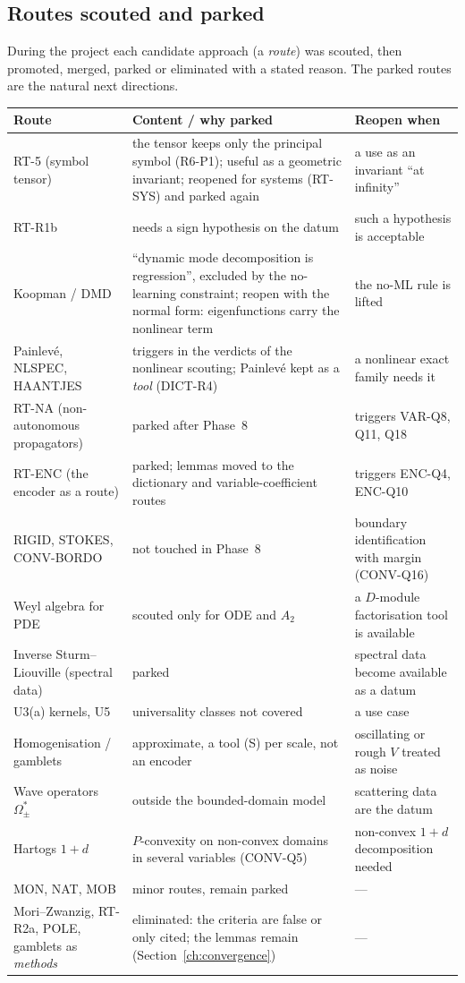 \subsection{Routes scouted and parked}

During the project each candidate approach (a \emph{route}) was scouted, then promoted, merged, parked or eliminated with a stated reason. The parked routes are the natural next directions.

\begin{center}\small
\begin{longtable}{@{}L{3.3cm}L{7.0cm}L{4.3cm}@{}}
\toprule
Route & Content / why parked & Reopen when\\\midrule\endhead
RT-5 (symbol tensor) & the tensor keeps only the principal symbol (R6-P1); useful as a geometric invariant; reopened for systems (RT-SYS) and parked again & a use as an invariant ``at infinity''\\
RT-R1b & needs a sign hypothesis on the datum & such a hypothesis is acceptable\\
Koopman / DMD & ``dynamic mode decomposition is regression'', excluded by the no-learning constraint; reopen with the normal form: eigenfunctions carry the nonlinear term & the no-ML rule is lifted\\
Painlev\'e, NLSPEC, HAANTJES & triggers in the verdicts of the nonlinear scouting; Painlev\'e kept as a \emph{tool} (DICT-R4) & a nonlinear exact family needs it\\
RT-NA (non-autonomous propagators) & parked after Phase~8 & triggers VAR-Q8, Q11, Q18\\
RT-ENC (the encoder as a route) & parked; lemmas moved to the dictionary and variable-coefficient routes & triggers ENC-Q4, ENC-Q10\\
RIGID, STOKES, CONV-BORDO & not touched in Phase~8 & boundary identification with margin (CONV-Q16)\\
Weyl algebra for PDE & scouted only for ODE and $A_2$ & a $D$-module factorisation tool is available\\
Inverse Sturm--Liouville (spectral data) & parked & spectral data become available as a datum\\
U3(a) kernels, U5 & universality classes not covered & a use case\\
Homogenisation / gamblets & approximate, a tool (S) per scale, not an encoder & oscillating or rough $V$ treated as noise\\
Wave operators $\Omega_\pm^*$ & outside the bounded-domain model & scattering data are the datum\\
Hartogs $1+d$ & $P$-convexity on non-convex domains in several variables (CONV-Q5) & non-convex $1+d$ decomposition needed\\
MON, NAT, MOB & minor routes, remain parked & ---\\
Mori--Zwanzig, RT-R2a, POLE, gamblets as \emph{methods} & eliminated: the criteria are false or only cited; the lemmas remain (Section~\ref{ch:convergence}) & ---\\
\bottomrule
\end{longtable}
\end{center}

